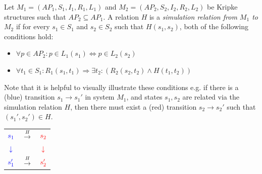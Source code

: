 \documentclass[10pt,a4paper]{article}
\begin{document}
Let $M_1=(AP_1,S_1,I_1,R_1,L_1)$ and $M_2=(AP_2,S_2,I_2,R_2,L_2)$ be Kripke structures such that $AP_2 \subseteq AP_1$. A relation $H$ is a \textit{simulation relation from $M_1$ to $M_2$} if for every $s_1 \in S_1$ and $s_2 \in S_2$ such that $H(s_1,s_2)$, both of the following conditions hold:
\begin{itemize}
    \item $\forall p \in AP_2 : p \in L_1(s_1) \iff p \in L_2(s_2)$
    \item $\forall t_1 \in S_1 :  R_1(s_1,t_1) \Rightarrow \exists t_2 : (R_2(s_2,t_2) \wedge H(t_1,t_2))$
\end{itemize}
Note that it is helpful to visually illustrate these conditions e.g. if there is a (blue) transition $s_1 \rightarrow s_1'$ in system $M_1$, and states $s_1,s_2$ are related via the simulation relation $H$, then there must exist a (red) transition $s_2 \rightarrow s_2'$ such that $(s_1',s_2') \in H$.
\begin{center}
\begin{tabular}{c c c}
    $\textcolor{blue}{s_1}$ & $\overset{H}{\longrightarrow}$ & $\textcolor{red}{s_2}$ \\
    $\textcolor{blue}{\downarrow}$ &  & $\textcolor{red}{\downarrow}$ \\
    $\textcolor{blue}{s_1'}$ & $\overset{H}{\longrightarrow}$ & $\textcolor{red}{s_2'}$
\end{tabular}
\end{center}
\end{document}
